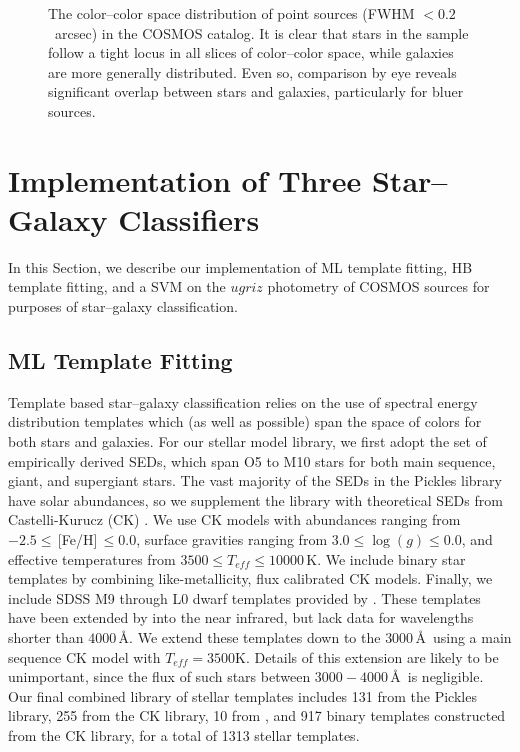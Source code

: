 \documentclass[12pt,preprint]{aastex}
\begin{document}
\begin{figure}
\centering
\caption{The color--color space distribution of point sources (FWHM $<
  0.2$~arcsec) in the COSMOS catalog.  It is clear that stars in the sample
  follow a tight locus in all slices of color--color space, while
  galaxies are more generally distributed.  Even so, comparison by eye
  reveals significant overlap between stars and galaxies, particularly
  for bluer sources.}
\label{fig:color-color-data}
\end{figure}


\section{Implementation of Three Star--Galaxy Classifiers}
\label{sec:specifics}

In this Section, we describe our implementation of ML template
fitting, HB template fitting, and a SVM on the $ugriz$ photometry of
COSMOS sources for purposes of star--galaxy classification.

\subsection{ML Template Fitting}
\label{ssec:MLspecifics}

Template based star--galaxy classification relies on the use of
spectral energy distribution templates which (as well as possible)
span the space of colors for both stars and galaxies.  For our stellar
model library, we first adopt the \citet{pickles98} set of empirically
derived SEDs, which span O5 to M10 stars for both main sequence,
giant, and supergiant stars.  The vast majority of the SEDs in the
Pickles library have solar abundances, so we supplement the library
with theoretical SEDs from Castelli-Kurucz (CK) \citep{castelli04a}.
We use CK models with abundances ranging from $-2.5
\le\,$[Fe/H]$\,\le0.0$, surface gravities ranging from
$3.0\le\log(g)\le0.0$, and effective temperatures from $3500 \le
T_{eff} \le 10000\,$K.  We include binary star templates by combining
like-metallicity, flux calibrated CK models.  Finally, we include SDSS
M9 through L0 dwarf templates provided by \citet{bochanski07}.  These
templates have been extended by \citeauthor{bochanski07} into the near
infrared, but lack data for wavelengths shorter than $4000\,$\AA.  We
extend these templates down to the $3000\,$\AA\, using a main sequence
CK model with $T_{eff}=3500$K.  Details of this extension are likely
to be unimportant, since the flux of such stars between
$3000-4000\,$\AA\, is negligible.  Our final combined library of stellar
templates includes 131 from the Pickles library, 255 from the CK library,
10 from \citet{bochanski07}, and 917 binary templates constructed from
the CK library, for a total of 1313 stellar templates.
\end{document}
